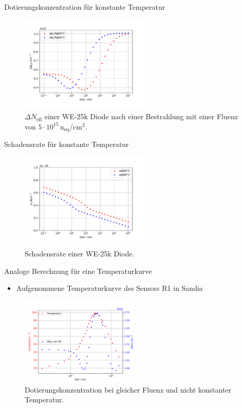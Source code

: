 \documentclass[aspectratio=1610, 9pt]{beamer}
\begin{document}
\begin{frame}{Dotierungskonzentration für konstante Temperatur}
  \begin{figure}
      \includegraphics[width=0.55\textwidth]{images/annealing.PDF}
  \caption{$\Delta N_{\mathrm{eff}}$ einer WE-25k Diode nach einer Bestrahlung mit einer Fluenz von
    $5\cdot 10^{15} \, \mathrm{n_{\mathrm{eq}}/cm^2}$.}
  \end{figure}
\end{frame}

\begin{frame}{Schadensrate für konstante Temperatur}
  \begin{figure}
      \includegraphics[width=0.55\textwidth]{images/damage.PDF}
  \caption{Schadensrate einer WE-25k Diode.}
  \end{figure}
\end{frame}


\begin{frame}{Analoge Berechnung für eine Temperaturkurve}
  \begin{itemize}
    \item Aufgenommene Temperaturkurve des Sensors R1 in Sandia
  \end{itemize}
  \begin{figure}
      \includegraphics[width=0.5\textwidth]{images/ohnekorrektur.PDF}
  \caption{Dotierungskonzentration bei gleicher Fluenz und nicht konstanter Temperatur.}
  \end{figure}
\end{frame}
\end{document}
